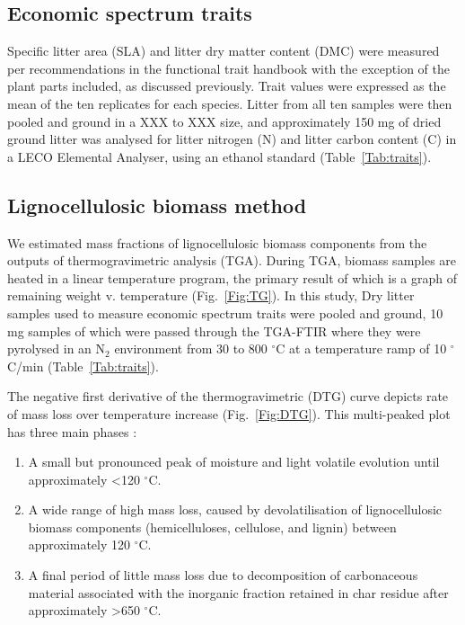 \documentclass{article}
\begin{document}
\subsection{Economic spectrum traits}
Specific litter area (SLA) and litter dry matter content (DMC) were measured per recommendations in the functional trait handbook \citep{perez-harguindeguy2013} with the exception of the plant parts included, as discussed previously. Trait values were expressed as the mean of the ten replicates for each species. Litter from all ten samples were then pooled and ground in a XXX to XXX size, and approximately 150 mg of dried ground litter was analysed for litter nitrogen (N) and litter carbon content (C) in a LECO Elemental Analyser, using an ethanol standard (Table~\ref{Tab:traits}). 

\subsection{Lignocellulosic biomass method}
We estimated mass fractions of lignocellulosic biomass components from the outputs of thermogravimetric analysis (TGA). During TGA, biomass samples are heated in a linear temperature program, the primary result of which is a graph of remaining weight v. temperature (Fig.~\ref{Fig:TG}). In this study, Dry litter samples used to measure economic spectrum traits were pooled and ground, 10 mg samples of which were passed through the TGA-FTIR where they were pyrolysed in an N$_2$ environment from 30 to 800 $^{\circ}$C at a temperature ramp of 10 $^{\circ}$C/min (Table~\ref{Tab:traits}). 

The negative first derivative of the thermogravimetric (DTG) curve depicts rate of mass loss over temperature increase (Fig.~\ref{Fig:DTG}). This multi-peaked plot has three main phases \citep{orfao2001}: 

\begin{enumerate}
	\item A small but pronounced peak of moisture and light volatile evolution until approximately \textless120 $^{\circ}$C.
	\item A wide range of high mass loss, caused by devolatilisation of lignocellulosic biomass components (hemicelluloses, cellulose, and lignin) between approximately 120 $^{\circ}$C.
	\item A final period of little mass loss due to decomposition of carbonaceous material associated with the inorganic fraction retained in char residue after approximately \textgreater650 $^{\circ}$C.
\end{enumerate}
\end{document}
